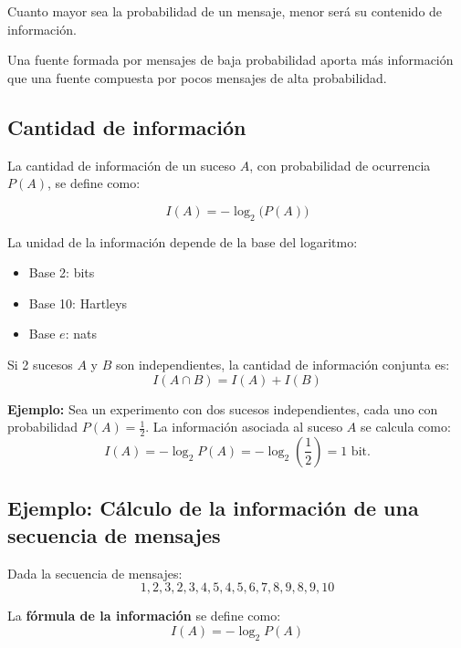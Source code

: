 \documentclass[11pt,a4paper]{article}
\begin{document}
\begin{NotaBox}
Cuanto mayor sea la probabilidad de un mensaje, menor será su contenido de información.

Una fuente formada por mensajes de baja probabilidad aporta más información que una fuente compuesta por pocos mensajes de alta probabilidad.
\end{NotaBox}

\subsection{Cantidad de información}

La cantidad de información de un suceso $A$, con probabilidad de ocurrencia $P(A)$, se define como:

\[
I(A) = - \log_{2}\!\big(P(A)\big)
\]

La unidad de la información depende de la base del logaritmo:
\begin{itemize}
	\item Base 2: bits
	\item Base 10: Hartleys
	\item Base $e$: nats
\end{itemize}

Si 2 sucesos $A$ y $B$ son independientes, la cantidad de información conjunta es:
\[
I(A \cap B) = I(A) + I(B)
\]

\textbf{Ejemplo:}
Sea un experimento con dos sucesos independientes, cada uno con probabilidad $P(A) = \frac{1}{2}$.
La información asociada al suceso $A$ se calcula como:
\[
I(A) = -\log_2 P(A) = -\log_2 \left(\frac{1}{2}\right) = 1 \text{ bit.}
\]

\subsection*{Ejemplo: Cálculo de la información de una secuencia de mensajes}

Dada la secuencia de mensajes:
\[
1, 2, 3, 2, 3, 4, 5, 4, 5, 6, 7, 8, 9, 8, 9, 10
\]

La \textbf{fórmula de la información} se define como:
\[
I(A) = -\log_2 P(A)
\]
\end{document}
